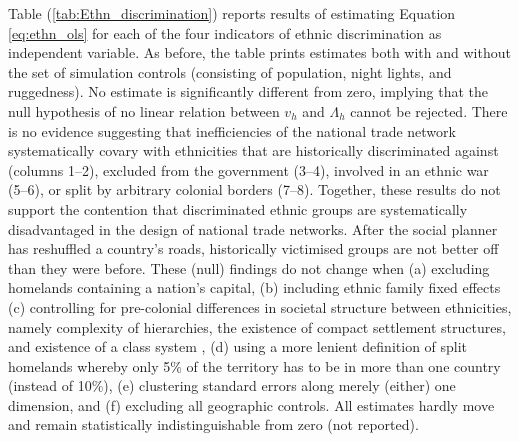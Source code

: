 \documentclass[11pt, oneside]{article}   	%
\let\oldref\ref
\renewcommand{\ref}[1]{(\oldref{#1})}
\begin{document}
Table \ref{tab:Ethn_discrimination} reports results of estimating Equation \eqref{eq:ethn_ols} for each of the four indicators of ethnic discrimination as independent variable. As before, the table prints estimates both with and without the set of simulation controls (consisting of population, night lights, and ruggedness). No estimate is significantly different from zero, implying that the null hypothesis of no linear relation between $v_{h}$ and $\Lambda_{h}$ cannot be rejected. There is no evidence suggesting that inefficiencies of the national trade network systematically covary with ethnicities that are historically discriminated against (columns 1--2), excluded from the government (3--4), involved in an ethnic war (5--6), or split by arbitrary colonial borders (7--8). Together, these results do not support the contention that discriminated ethnic groups are systematically disadvantaged in the design of national trade networks. After the social planner has reshuffled a country's roads, historically victimised groups are not better off than they were before. These (null) findings do not change when (a) excluding homelands containing a nation's capital, (b) including ethnic family fixed effects (c) controlling for pre-colonial differences in societal structure between ethnicities, namely complexity of hierarchies, the existence of compact settlement structures, and existence of a class system \citep{michalopoulos_pre-colonial_2013}, (d) using a more lenient definition of split homelands whereby only 5\% of the territory has to be in more than one country (instead of 10\%), (e) clustering standard errors along merely (either) one dimension, and (f) excluding all geographic controls. All estimates hardly move and remain statistically indistinguishable from zero (not reported).
\end{document}
